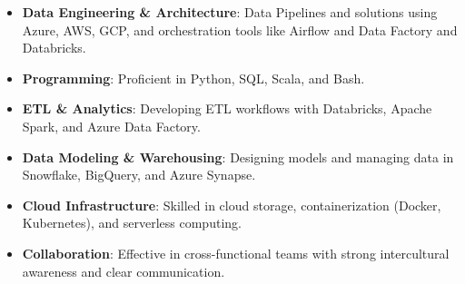 \documentclass[a4paper,12pt,usenames,dvipsnames]{scrartcl}
\newcommand\VRule{\color{lightGray}\vrule width 0.25pt}
\newcommand{\preSectionSpace}{\vspace{3.2pt}}
\newcommand{\afterSectionSpace}{\vspace{2.3pt}}
\newcommand{\cvLocation}[2]{\scriptsize\ #1, #2}
\newcommand{\cvSection}[1]{\preSectionSpace{\large\textcolor{black}{#1}}\afterSectionSpace}
\newcommand{\cvDate}[1]{\scriptsize #1}
\newcommand{\spaceBetweenCvEntry}{\\[6pt]}
\newcommand{\berlin}{\cvLocation{Berlin}{Germany}}
\begin{document}
    \begin{comment}
    
        \cvSection{Talks \& Conferences}
 	
	\begin{tabular}{L!{\VRule}R}
		\cvDate{05/2019}  & \textbf{Airline Group of the International Federation of Operational Research} \\
		\cvLocation{Panamá}{Panamá} & \textbf{Societies} - AGIFORS 2019\\
		      & Revenue Management SG yearly \href{https://agifors.org/rm-2019}{meeting}.\spaceBetweenCvEntry
		\cvDate{09/17} & \textbf{International Conference on Operations Research} - OR 17\\
		\berlin & Speaker at the Airline Revenue Management on the Pricing \& Revenue Management stream.           \href{https://www.dropbox.com/s/h7vtkc215zh3r43/OR_17.pdf?dl=0}{Presentation}.
		
	\end{tabular}
	
	
	\cvSection{Publications}
	
	\begin{tabular}{L!{\VRule}R}
		
		\cvDate{09/17} & \textbf{A  stochastic  dynamic  pricing  model  for  passenger air transportation}\\
		\berlin & Modelling the airline revenue management pricing problem within a Markov Decision Process. \href{https://www.euro-online.org/conf/admin/tmp/program-gor17.pdf}{Abstract}. 

	\end{tabular}
 \end{comment}
    	
    \cvSection{Core Skills}

    {\small
    \begin{itemize}[parsep=0pt, topsep=0pt, itemsep=2pt, leftmargin=1.5em]
      \item \textbf{Data Engineering \& Architecture}: Data Pipelines and solutions using Azure, AWS, GCP, and orchestration tools like Airflow and Data Factory and Databricks.
      \item \textbf{Programming}: Proficient in Python, SQL, Scala, and Bash.
      \item \textbf{ETL \& Analytics}: Developing ETL workflows with Databricks, Apache Spark, and Azure Data Factory.
      \item \textbf{Data Modeling \& Warehousing}: Designing models and managing data in Snowflake, BigQuery, and Azure Synapse.
      \item \textbf{Cloud Infrastructure}: Skilled in cloud storage, containerization (Docker, Kubernetes), and serverless computing.
      \item \textbf{Collaboration}: Effective in cross-functional teams with strong intercultural awareness and clear communication.
    \end{itemize}
    }
    
\end{document}

